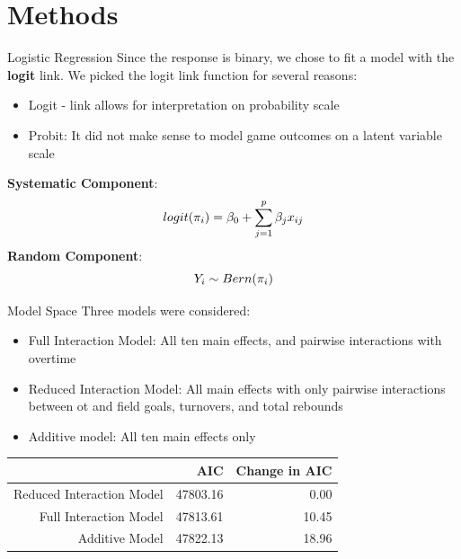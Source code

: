 \documentclass{beamer}
\begin{document}
	
	\section{Methods}
	
	\begin{frame}[t]{Logistic Regression}
	Since the response is binary, we chose to fit a model with the \textbf{logit} link. We picked the logit link function for several reasons: 
	\begin{itemize}
		\item Logit - link allows for interpretation on probability scale
		\item Probit: It did not make sense to model game outcomes on a latent variable scale
		
	\end{itemize}
\textbf{Systematic Component}: 
\begin{eqnarray*} \label{eq:logit}
\centering
logit(\pi_{i})=\beta_{0}+\sum_{j=1}^{p} \beta_{j}x_{ij}
\end{eqnarray*} 
\textbf{Random Component}: 
\begin{equation*}
\centering
Y_i \sim Bern(\pi_i)
\end{equation*}
	\end{frame}
	

\begin{frame}{Model Space}
Three models were considered:
\begin{itemize}
	\item Full Interaction Model: All ten main effects, and pairwise interactions with overtime
	\item Reduced Interaction Model: All main effects with only pairwise interactions between ot and field goals, turnovers, and total rebounds
	\item Additive model: All ten main effects only
\end{itemize}
\begin{table}[h]
	\centering
	\begin{tabular}{rrr}
		\hline
		& AIC & Change in AIC \\ 
		\hline
		Reduced Interaction Model & 47803.16 & 0.00 \\ 
		Full Interaction Model & 47813.61 & 10.45 \\ 
		Additive Model & 47822.13 & 18.96 \\ 
		\hline
	\end{tabular}
\end{table}
\end{frame}	
	
\end{document}
